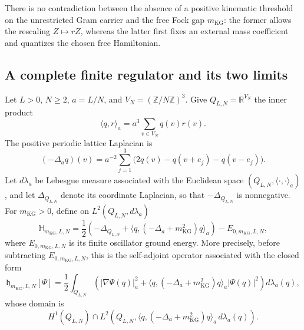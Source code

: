 There is no contradiction between the absence of a positive kinematic
threshold on the unrestricted Gram carrier and the free Fock gap
\(m_{\mathrm{KG}}\): the former allows the rescaling \(Z\mapsto rZ\), whereas
the latter first fixes an external mass coefficient and quantizes the chosen
free Hamiltonian.

\subsection{A complete finite regulator and its two limits}

Let \(L>0\), \(N\geq2\), \(a=L/N\), and
\(V_N=(\mathbb Z/N\mathbb Z)^3\).  Give
\(Q_{L,N}=\mathbb R^{V_N}\) the inner product
\begin{equation}
 \langle q,r\rangle_a=a^3\sum_{v\in V_N}q(v)r(v).
 \label{hnsp-lattice-inner-product}
\end{equation}
The positive periodic lattice Laplacian is
\begin{equation}
 (-\Delta_a q)(v)=a^{-2}\sum_{j=1}^3
 \bigl(2q(v)-q(v+e_j)-q(v-e_j)\bigr).
 \label{hnsp-lattice-laplacian}
\end{equation}
Let \(d\lambda_a\) be Lebesgue measure associated with the Euclidean space
\((Q_{L,N},\langle\cdot,\cdot\rangle_a)\), and let
\(\Delta_{Q_{L,N}}\) denote its coordinate Laplacian, so that
\(-\Delta_{Q_{L,N}}\) is nonnegative.  For
\(m_{\mathrm{KG}}>0\), define on \(L^2(Q_{L,N},d\lambda_a)\)
\begin{equation}
 \mathbb H_{m_{\mathrm{KG}},L,N}
 =\frac12\left(-\Delta_{Q_{L,N}}
 +\langle q,(-\Delta_a+m_{\mathrm{KG}}^2)q\rangle_a\right)
 -E_{0,m_{\mathrm{KG}},L,N},
 \label{hnsp-lattice-hamiltonian}
\end{equation}
where \(E_{0,m_{\mathrm{KG}},L,N}\) is its finite oscillator ground energy.
More precisely, before subtracting \(E_{0,m_{\mathrm{KG}},L,N}\), this is the self-adjoint
operator associated with the closed form
\begin{equation}
 \mathfrak h_{m_{\mathrm{KG}},L,N}[\Psi]
 =\frac12\int_{Q_{L,N}}
 \left(|\nabla\Psi(q)|_a^2
 +\langle q,(-\Delta_a+m_{\mathrm{KG}}^2)q\rangle_a
             |\Psi(q)|^2\right)d\lambda_a(q),
 \label{hnsp-lattice-closed-form}
\end{equation}
whose domain is
\begin{equation}
 H^1(Q_{L,N})\cap
 L^2\!\left(Q_{L,N},
  \langle q,(-\Delta_a+m_{\mathrm{KG}}^2)q\rangle_a\,
  d\lambda_a(q)\right).
 \label{hnsp-lattice-form-domain}
\end{equation}

